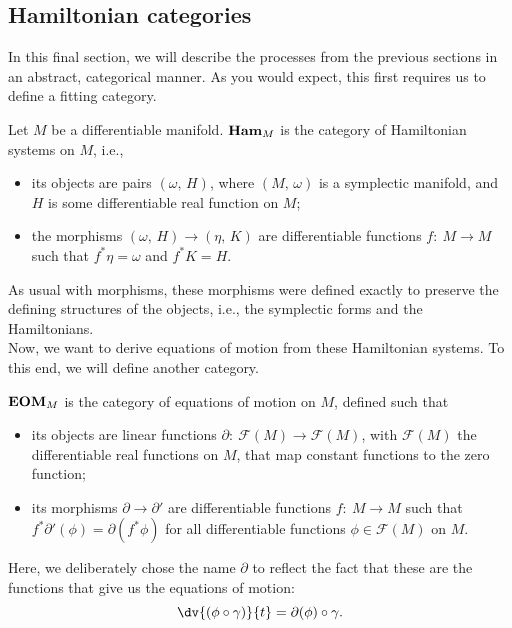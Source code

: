 \documentclass{article}
\newcommand{\category}[1]{{\normalfont\textbf{#1}}}
\begin{document}
\begin{multicols}{2}
	\section{Hamiltonian categories}
	In this final section, we will describe the processes from the previous sections in an abstract, categorical manner. As you would expect, this first requires us to define a fitting category.
	\begin{definition}
		Let \(M\) be a differentiable manifold. \(\category{Ham}_M\) is the category of Hamiltonian systems on \(M\), i.e.,
		\begin{itemize}
			\item its objects are pairs \((\omega,\,H)\), where \((M,\,\omega)\) is a symplectic manifold, and \(H\) is some differentiable real function on \(M\);
			\item the morphisms \((\omega,\,H) \to (\eta,\,K)\) are differentiable functions \(f:\ M\to M\) such that \(f^*\eta = \omega\) and \(f^*K = H\).
		\end{itemize}
	\end{definition}
	As usual with morphisms, these morphisms were defined exactly to preserve the defining structures of the objects, i.e., the symplectic forms and the Hamiltonians.\\
	Now, we want to derive equations of motion from these Hamiltonian systems. To this end, we will define another category.
	\begin{definition}
		\(\category{EOM}_M\) is the category of equations of motion on \(M\), defined such that
		\begin{itemize}
			\item its objects are linear functions \(\partial:\ \mathcal{F}(M)\to \mathcal{F}(M)\), with \(\mathcal{F}(M)\) the differentiable real functions on \(M\), that map constant functions to the zero function;
			\item its morphisms \(\partial \to \partial'\) are differentiable functions \(f:\ M\to M\) such that \(f^*\partial'(\phi) = \partial(f^*\phi)\) for all differentiable functions \(\phi\in\mathcal{F}(M)\) on \(M\).
		\end{itemize}
	\end{definition}
	Here, we deliberately chose the name \(\partial\) to reflect the fact that these are the functions that give us the equations of motion:
	\begin{equation}
		\dv{(\phi\circ\gamma)}{t} = \partial(\phi)\circ\gamma.

\end{equation}
\end{multicols}
\end{document}
